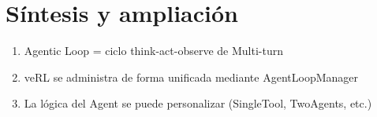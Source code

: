 \section{Síntesis y ampliación}
\begin{enumerate}
  \item Agentic Loop = ciclo think-act-observe de Multi-turn
  \item veRL se administra de forma unificada mediante AgentLoopManager
  \item La lógica del Agent se puede personalizar (SingleTool, TwoAgents, etc.)
\end{enumerate}


